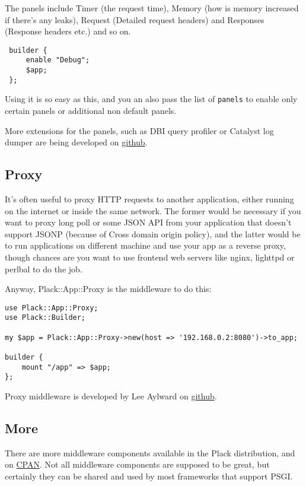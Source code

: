 The panels include Timer (the request time), Memory (how is memory
increased if there's any leaks), Request (Detailed request headers) and
Responses (Response headers etc.) and so on.

\begin{lstlisting}
 builder {
     enable "Debug";
     $app;
 };
\end{lstlisting}

Using it is so easy as this, and you an also pass the list of
\lstinline!panels! to enable only certain panels or additional non
default panels.

More extensions for the panels, such as DBI query profiler or Catalyst
log dumper are being developed on
\href{http://github.com/miyagawa/plack-middleware-debug/}{github}.

\subsection{Proxy}\label{proxy}

It's often useful to proxy HTTP requests to another application, either
running on the internet or inside the same network. The former would be
necessary if you want to proxy long poll or some JSON API from your
application that doesn't support JSONP (because of Cross domain origin
policy), and the latter would be to run applications on different
machine and use your app as a reverse proxy, though chances are you want
to use frontend web servers like nginx, lighttpd or perlbal to do the
job.

Anyway, Plack::App::Proxy is the middleware to do this:

\begin{lstlisting}
use Plack::App::Proxy;
use Plack::Builder;

my $app = Plack::App::Proxy->new(host => '192.168.0.2:8080')->to_app;

builder {
    mount "/app" => $app;
};
\end{lstlisting}

Proxy middleware is developed by Lee Aylward on
\href{http://github.com/leedo/Plack-App-Proxy}{github}.

\subsection{More}\label{more}

There are more middleware components available in the Plack
distribution, and on
\href{http://search.cpan.org/search?query=plack+middleware\&mode=dist}{CPAN}.
Not all middleware components are supposed to be great, but certainly
they can be shared and used by most frameworks that support PSGI.

